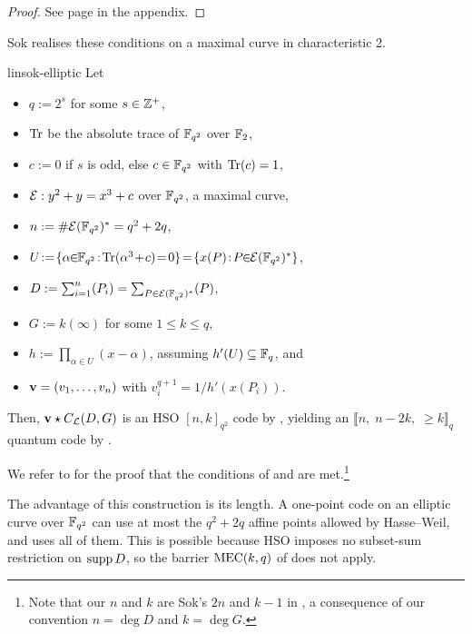 \documentclass[twocolumn, 11pt]{scrartcl}
\begin{document}
{\begin{proof}
    See page \pageref{proof:hso-criterion} in the appendix.
\end{proof}

Sok realises these conditions on a maximal curve in characteristic 2.

\begin{construction}{\cite[Constr.~5 \& Thm.~6]{sok2021new}}{linsok-elliptic}
    Let
    \begin{itemize}[itemsep=-2pt]
        \item $q:=2^s$ for some $s\in\mathbb{Z}^+$,
        \item $\operatorname{Tr}$ be the absolute trace of $\mathbb{F}_{q^2}$ over $\mathbb{F}_2$,
        \item $c:=0$ if $s$ is odd, else $c\in\mathbb{F}_{q^2}$ with $\operatorname{Tr}(c)=1$,
        \item $\mathcal{E}:y^2+y=x^3+c$ over $\mathbb{F}_{q^2}$, a maximal curve,
        \item $n:=\#\mathcal{E}(\mathbb{F}_{q^2})^*=q^2+2q$,
        \item $U\!:=\!\set{\alpha\!\!\in\!\!\bbF_{q^2}\!:\!\Trace(\alpha^3\!+\!c)\!=\!0}\!=\!\set{x(P)\!:\!P\!\!\in\!\!\mcE(\bbF_{q^2})^*}$,
        \item $D:=\sum_{i=1}^{n}(P_i)=\sum_{P\in\mathcal{E}(\mathbb{F}_{q^2})^*} (P)$,
        \item $G:=k(\infty)$ for some $1\leq k\leq q$,
        \item $h:=\prod_{\alpha\in U}(x-\alpha)$, assuming $h'(U)\subseteq\mathbb{F}_q$, and
        \item $\mathbf{v}=(v_1,\hdots,v_n)$ with $v_i^{q+1}=1/h'(x(P_i))$.
    \end{itemize}
    
    \bigskip
    Then, $\mathbf{v}\star C_\mathcal{L}(D,G)$ is an HSO $[n,k]_{q^2}$ code by , yielding an $\llbracket n,\;n-2k,\;\geq k\rrbracket_q$ quantum code by .
\end{construction}

We refer to \cite[Constr.~5 \& Thm.~6]{sok2021new} for the proof that the conditions of  and  are met.\footnote{Note that our $n$ and $k$ are Sok's $2n$ and $k-1$ in \cite{sok2021new}, a consequence of our convention $n=\deg D$ and $k=\deg G$.}

The advantage of this construction is its length. A one-point code on an elliptic curve over $\mathbb{F}_{q^2}$ can use at most the $q^2+2q$ affine points allowed by Hasse--Weil, and  uses all of them. This is possible because HSO imposes no subset-sum restriction on $\operatorname{supp} D$, so the barrier $\operatorname{MEC}(k,q)$ of  does not apply.

}
\end{document}
